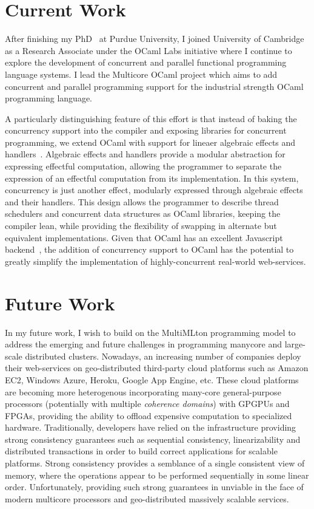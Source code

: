 \documentclass[screen,acmsmall,nonacm]{acmart}
\begin{document}
\section*{Current Work}

After finishing my PhD~\cite{thesis} at Purdue University, I joined University
of Cambridge as a Research Associate under the OCaml Labs initiative where I
continue to explore the development of concurrent and parallel functional
programming language systems. I lead the Multicore OCaml project which aims to
add concurrent and parallel programming support for the industrial strength
OCaml programming language.

A particularly distinguishing feature of this effort is that instead of baking
the concurrency support into the compiler and exposing libraries for concurrent
programming, we extend OCaml with support for lineaer algebraic effects and
handlers~\cite{effects}. Algebraic effects and handlers provide a modular
abstraction for expressing effectful computation, allowing the programmer to
separate the expression of an effectful computation from its implementation. In
this system, concurrency is just another effect, modularly expressed through
algebraic effects and their handlers. This design allows the programmer to
describe thread schedulers and concurrent data structures as OCaml libraries,
keeping the compiler lean, while providing the flexibility of swapping in
alternate but equivalent implementations. Given that OCaml has an excellent
Javascript backend~\cite{js_of_ocaml}, the addition of concurrency support to
OCaml has the potential to greatly simplify the implementation of
highly-concurrent real-world web-services.

\section*{Future Work}

In my future work, I wish to build on the MultiMLton programming model to
address the emerging and future challenges in programming manycore and
large-scale distributed clusters. Nowadays, an increasing number of companies
deploy their web-services on geo-distributed third-party cloud platforms such
as Amazon EC2, Windows Azure, Heroku, Google App Engine, etc. These cloud
platforms are becoming more heterogenous incorporating many-core
general-purpose processors (potentially with multiple \emph{coherence domains})
with GPGPUs and FPGAs, providing the ability to offload expensive computation
to specialized hardware. Traditionally, developers have relied on the
infrastructure providing strong consistency guarantees such as sequential
consistency, linearizability and distributed transactions in order to build
correct applications for scalable platforms. Strong consistency provides a
semblance of a single consistent view of memory, where the operations appear to
be performed sequentially in some linear order. Unfortunately, providing such
strong guarantees in unviable in the face of modern multicore processors and
geo-distributed massively scalable services.
\end{document}
